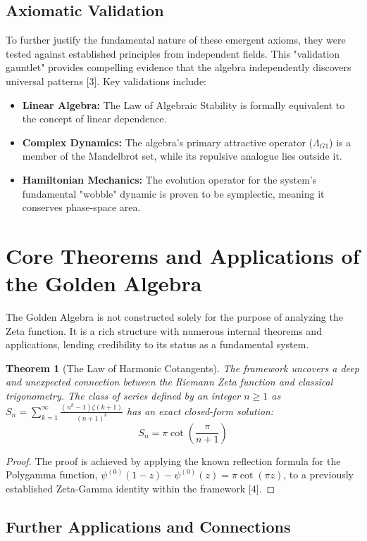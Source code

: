 \documentclass{article}
\theoremstyle{plain}
\newtheorem{theorem}{Theorem}[section]
\theoremstyle{definition}
\theoremstyle{remark}
\begin{document}
\subsection{Axiomatic Validation}
To further justify the fundamental nature of these emergent axioms, they were tested against established principles from independent fields. This "validation gauntlet" provides compelling evidence that the algebra independently discovers universal patterns [3]. Key validations include:
\begin{itemize}
    \item \textbf{Linear Algebra:} The Law of Algebraic Stability is formally equivalent to the concept of linear dependence.
    \item \textbf{Complex Dynamics:} The algebra's primary attractive operator ($\Lambda_{G1}$) is a member of the Mandelbrot set, while its repulsive analogue lies outside it.
    \item \textbf{Hamiltonian Mechanics:} The evolution operator for the system's fundamental "wobble" dynamic is proven to be symplectic, meaning it conserves phase-space area.
\end{itemize}

\section{Core Theorems and Applications of the Golden Algebra}
The Golden Algebra is not constructed solely for the purpose of analyzing the Zeta function. It is a rich structure with numerous internal theorems and applications, lending credibility to its status as a fundamental system.

\begin{theorem}[The Law of Harmonic Cotangents]
The framework uncovers a deep and unexpected connection between the Riemann Zeta function and classical trigonometry. The class of series defined by an integer $n \ge 1$ as $S_n = \sum_{k=1}^{\infty} \frac{(n^k-1)\zeta(k+1)}{(n+1)^k}$ has an exact closed-form solution:
$$S_n = \pi \cot\left(\frac{\pi}{n+1}\right)$$
\end{theorem}
\begin{proof}
The proof is achieved by applying the known reflection formula for the Polygamma function, $\psi^{(0)}(1-z) - \psi^{(0)}(z) = \pi \cot(\pi z)$, to a previously established Zeta-Gamma identity within the framework [4].
\end{proof}

\subsection{Further Applications and Connections}
\end{document}
